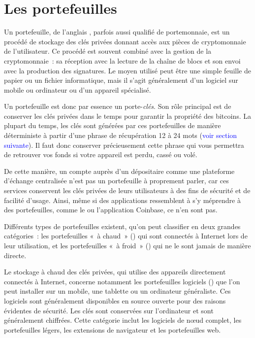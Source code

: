 \section*{Les portefeuilles}


Un portefeuille, de l'anglais , parfois aussi qualifié de portemonnaie, est un procédé de stockage des clés privées donnant accès aux pièces de cryptomonnaie de l'utilisateur. Ce procédé est souvent combiné avec la gestion de la cryptomonnaie~: sa réception avec la lecture de la chaîne de blocs et son envoi avec la production des signatures. Le moyen utilisé peut être une simple feuille de papier ou un fichier informatique, mais il s'agit généralement d'un logiciel sur mobile ou ordinateur ou d'un appareil spécialisé.

Un portefeuille est donc par essence un porte-\emph{clés}. Son rôle principal est de conserver les clés privées dans le temps pour garantir la propriété des bitcoins. La plupart du temps, les clés sont générées par ces portefeuilles de manière déterministe à partir d'une phrase de récupération 12 à 24 mots (\textcolor{blue}{voir section suivante}). Il faut donc conserver précieusement cette phrase qui vous permettra de retrouver vos fonds si votre appareil est perdu, cassé ou volé.

De cette manière, un compte auprès d'un dépositaire comme une plateforme d'échange centralisée n'est pas un portefeuille à proprement parler, car ces services conservent les clés privées de leurs utilisateurs à des fins de sécurité et de facilité d'usage. Ainsi, même si des applications ressemblent à s'y méprendre à des portefeuilles, comme le  ou l'application Coinbase, ce n'en sont pas. 

Différents types de portefeuilles existent, qu'on peut classifier en deux grandes catégories~: les portefeuilles «~à chaud~» () qui sont connectés à Internet lors de leur utilisation, et les portefeuilles «~à froid~» () qui ne le sont jamais de manière directe.


Le stockage à chaud des clés privées, qui utilise des appareils directement connectés à Internet, concerne notamment les portefeuilles logiciels () que l'on peut installer sur un mobile, une tablette ou un ordinateur généraliste. Ces logiciels sont généralement disponibles en source ouverte pour des raisons évidentes de sécurité. Les clés sont conservées sur l'ordinateur et sont généralement chiffrées. Cette catégorie inclut les logiciels de nœud complet, les portefeuilles légers, les extensions de navigateur et les portefeuilles web.

